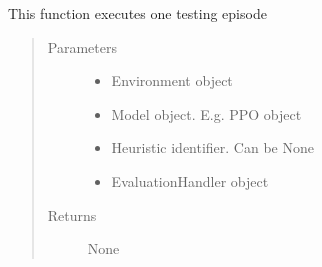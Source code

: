 \documentclass[letterpaper,10pt,english]{sphinxmanual}
\begin{document}
\begin{fulllineitems}
\label{\detokenize{agents.reinforcement_learning:agents.test.run_episode}}
\sphinxAtStartPar
This function executes one testing episode
\begin{quote}\begin{description}
\item[{Parameters}] \leavevmode\begin{itemize}
\item {} 
\sphinxAtStartPar
{} \textendash{} Environment object

\item {} 
\sphinxAtStartPar
{} \textendash{} Model object. E.g. PPO object

\item {} 
\sphinxAtStartPar
{} \textendash{} Heuristic identifier. Can be None

\item {} 
\sphinxAtStartPar
{} \textendash{} EvaluationHandler object

\end{itemize}

\item[{Returns}] \leavevmode
\sphinxAtStartPar
None

\end{description}\end{quote}

\end{fulllineitems}

\end{document}
